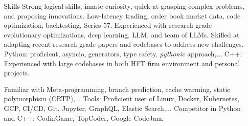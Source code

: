 \begin{rubric}{Skills}
\entry*[]%
Strong logical skills, innate curiosity, quick at grasping complex problems, and proposing innovations.
\entry*[]%
Low-latency trading, order book market data, code optimization, backtesting, Series 57.
\entry*[]%
Experienced with research-grade evolutionary optimizations, deep learning, LLM, and team of LLMs.
\entry*[]%
Skilled at adapting recent research-grade papers and codebases to address new challenges. 
%
%
\entry*[]%
Python:  proficient, asyncio, generators, type safety, \textit{pythonic} approach,...
\entry*[]%
C++: Experienced with large codebases in both HFT firm environment and personal projects. 

Familiar with Meta-programming, branch prediction, cache warming, static polymorphism (CRTP),...
\entry*[]%
Tools: Proficient user of Linux, Docker, Kubernetes, GCP, CI/CD, Git, Jupyter, GraphQL, Elastic Search,...
\entry*[]%
Competitor in Python and C++: CodinGame, TopCoder, Google CodeJam. 
%
%
\end{rubric}
